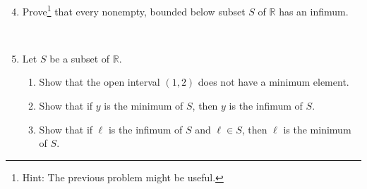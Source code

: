 \documentclass[12pt]{amsart}
\newcommand{\R}{\mathbb{R}}
\begin{document}
\begin{enumerate}\setcounter{enumi}{3}
\item Prove\footnote{Hint: The previous problem might be useful.} that every nonempty, bounded below subset $S$ of $\R$ has an infimum.

\



\item Let $S$ be a subset of $\R$.
\begin{enumerate}
\item Show that the open interval $(1,2)$ does not have a minimum element.
\item Show that if $y$ is the minimum of $S$, then $y$ is the infimum of $S$.
\item Show that if $\ell$ is the infimum of $S$ and $\ell \in S$, then $\ell$ is the minimum of $S$.
\end{enumerate}
\end{enumerate}
\end{document}
